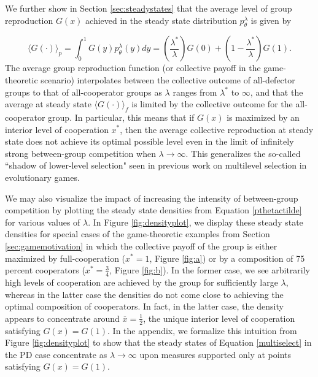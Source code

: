 \documentclass[11pt]{article}
\numberwithin{equation}{section}
\begin{document}
{We further show in Section \ref{sec:steadystates} that the average level of group reproduction $G(x)$ achieved in the steady state distribution $p^{\lambda}_{\theta}$ is given by

\begin{equation} \label{eq:averageofthetawithlambdastar}
    \langle G(\cdot) \rangle_p = \int_0^1 G(y) p^{\lambda}_{\theta}(y) dy = \left(\frac{\lambda^*}{\lambda}\right) G(0) + \left( 1 - \frac{\lambda^*}{\lambda} \right) G(1).
\end{equation}
The average group reproduction function (or collective payoff in the game-theoretic scenario) interpolates between the collective outcome of all-defector groups to that of all-cooperator groups as $\lambda$ ranges from $\lambda^*$ to $\infty$, and that the average at steady state $\langle G(\cdot) \rangle_f$ is limited by the collective outcome for the all-cooperator group. In particular, this means that if $G(x)$ is maximized by an interior level of cooperation $x^*$, then the average collective reproduction at steady state does not achieve its optimal possible level even in the limit of infinitely strong between-group competition when $\lambda \to \infty$. This generalizes the so-called ``shadow of lower-level selection" seen in previous work on multilevel selection in evolutionary games.

We may also visualize the impact of increasing the intensity of between-group competition by plotting the steady state densities from Equation \eqref{pthetactilde} for various values of $\lambda$. In Figure \ref{fig:densityplot}, we display these steady state densities for special cases of the game-theoretic examples from Section \ref{sec:gamemotivation} in which the collective payoff of the group is either maximized by full-cooperation ($x^* = 1$, Figure \ref{fig:a}) or by a composition of 75 percent cooperators ($x^* = \frac{3}{4}$, Figure \ref{fig:b}). In the former case, we see arbitrarily high levels of cooperation are achieved by the group for sufficiently large $\lambda$, whereas in the latter case the densities do not come close to achieving the optimal composition of cooperators. In fact, in the latter case, the density appears to concentrate around $\overline{x} = \frac{1}{2}$, the unique interior level of cooperation satisfying $G(x) = G(1)$. In the appendix, we formalize this intuition from Figure \ref{fig:densityplot} to show that the steady states of Equation \eqref{multiselect} in the PD case concentrate as $\lambda \to \infty$ upon measures supported only at points satisfying $G(x) = G(1)$.

}
\end{document}
